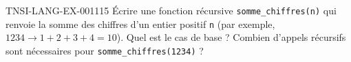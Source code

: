 \begin{exercice}{TNSI-LANG-EX-001}{1}{15}
Écrire une fonction récursive \lstinline{somme_chiffres(n)} qui renvoie la somme des chiffres d'un entier positif \lstinline{n} (par exemple, $1234 \to 1+2+3+4 = 10$). Quel est le cas de base ? Combien d'appels récursifs sont nécessaires pour \lstinline{somme_chiffres(1234)} ?
\end{exercice}
